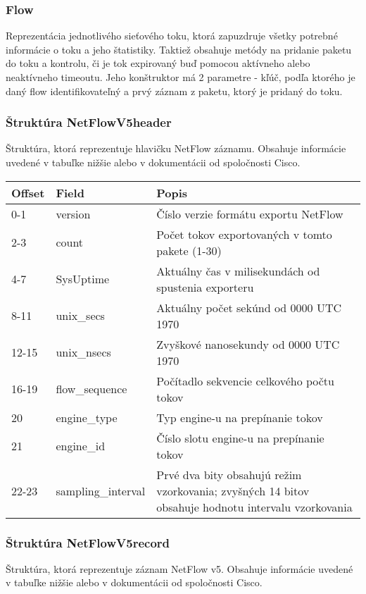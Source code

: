 \documentclass[a4paper, 12pt]{article}
\begin{document}
\subsubsection{Flow}
Reprezentácia jednotlivého sieťového toku, ktorá zapuzdruje všetky potrebné informácie o toku a jeho štatistiky. Taktiež obsahuje metódy na pridanie paketu do toku a kontrolu, či je tok expirovaný buď pomocou aktívneho alebo neaktívneho timeoutu. Jeho konštruktor má 2 parametre - kľúč, podľa ktorého je daný flow identifikovateľný a prvý záznam z paketu, ktorý je pridaný do toku.

\newpage

\subsubsection{Štruktúra NetFlowV5header}
Štruktúra, ktorá reprezentuje hlavičku NetFlow záznamu. Obsahuje informácie uvedené v tabuľke nižšie alebo v dokumentácii od spoločnosti Cisco\cite{cisco}\cite{ibm}.

\begin{table}[h]
\centering
\begin{tabular}{|l|l|l|}
\hline
\textbf{Offset} & \textbf{Field} & \textbf{Popis} \\
\hline
0-1 & version & Číslo verzie formátu exportu NetFlow \\
2-3 & count & Počet tokov exportovaných v tomto pakete (1-30) \\
4-7 & SysUptime & Aktuálny čas v milisekundách od spustenia exporteru \\
8-11 & unix\_secs & Aktuálny počet sekúnd od 0000 UTC 1970 \\
12-15 & unix\_nsecs & Zvyškové nanosekundy od 0000 UTC 1970 \\
16-19 & flow\_sequence & Počítadlo sekvencie celkového počtu tokov \\
20 & engine\_type & Typ engine-u na prepínanie tokov \\
21 & engine\_id & Číslo slotu engine-u na prepínanie tokov \\
22-23 & sampling\_interval & Prvé dva bity obsahujú režim vzorkovania; zvyšných 14 bitov obsahuje hodnotu intervalu vzorkovania \\
\hline
\end{tabular}
\end{table}

\subsubsection{Štruktúra NetFlowV5record}
Štruktúra, ktorá reprezentuje záznam NetFlow v5. Obsahuje informácie uvedené v tabuľke nižšie alebo v dokumentácii od spoločnosti Cisco\cite{cisco}\cite{ibm}.
\end{document}
